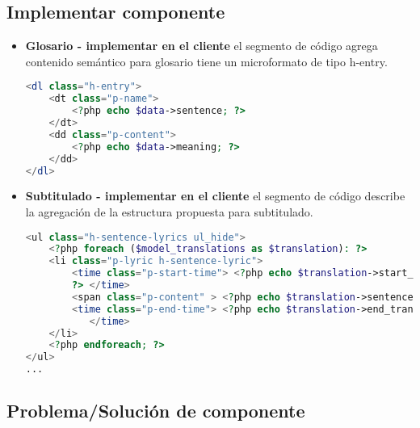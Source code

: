 \subsection{Implementar componente}

\begin{itemize}

\item \textbf{Glosario - implementar en el cliente} el segmento de código
agrega contenido semántico para glosario tiene un microformato de tipo
h-entry.

\begin{lstlisting}[language = PHP, caption={Representación de glosario.}]
<dl class="h-entry">
    <dt class="p-name">
        <?php echo $data->sentence; ?> 
    </dt> 
    <dd class="p-content">
        <?php echo $data->meaning; ?> 
    </dd>
</dl>
\end{lstlisting}

\item \textbf{Subtitulado - implementar en el cliente} el segmento de código
describe la agregación de la estructura propuesta para subtitulado.

\begin{lstlisting}[language = PHP, caption={Estructura de sentencia.}]
<ul class="h-sentence-lyrics ul_hide">
    <?php foreach ($model_translations as $translation): ?>  
    <li class="p-lyric h-sentence-lyric"> 
        <time class="p-start-time"> <?php echo $translation->start_translation;
        ?> </time>    
        <span class="p-content" > <?php echo $translation->sentence; ?></span>
        <time class="p-end-time"> <?php echo $translation->end_translation;?> 
           </time>
    </li>
    <?php endforeach; ?>
</ul>
...
\end{lstlisting}

\end{itemize}

\subsection{Problema/Solución de componente}

